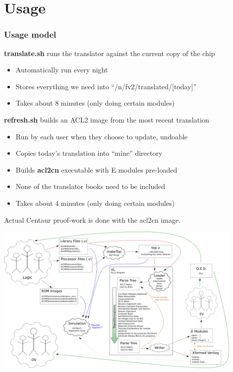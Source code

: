 \documentclass[mathserif]{beamer}
\newcommand{\Highlight}[1]{{\color{Highlight}#1}}
\begin{document}
\section{Usage}

\begin{frame}
\frametitle{Usage model}

{\bf translate.sh} runs the translator against the current copy of the chip
\begin{itemize}
\item Automatically run every night
\item Stores everything we need into ``/n/fv2/translated/[today]''
\item Takes about 8 minutes (only doing certain modules)
\end{itemize}

\bigskip

{\bf refresh.sh} builds an ACL2 image from the most recent translation
\begin{itemize}
\item Run by each user \Highlight{when they choose} to update, undoable
\item Copies today's translation into ``mine'' directory 
\item Builds {\bf acl2cn} executable with E modules pre-loaded
\item None of the translator books need to be included 
\item Takes about 4 minutes (only doing certain modules)
\end{itemize}

\bigskip

Actual Centaur proof-work is done with the acl2cn image.

\end{frame}


\begin{frame}
\begin{center}
\includegraphics[width=12cm]{vl}
\end{center}
\end{frame}
\end{document}
